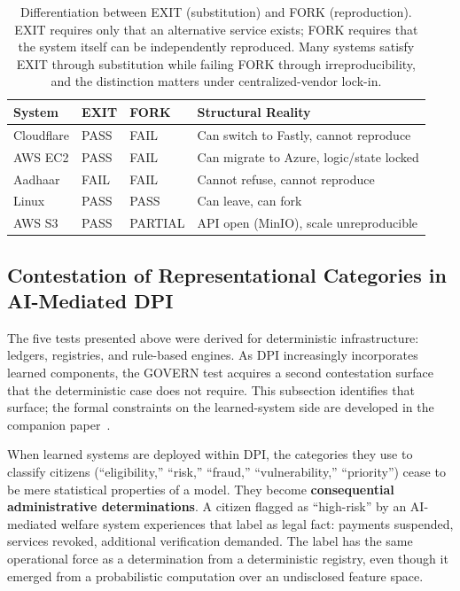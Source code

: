 \documentclass{article}
\begin{document}
\begin{table}[htbp]
\centering
\begin{tabular}{@{}lllp{5.5cm}@{}}
\toprule
\textbf{System} & \textbf{EXIT} & \textbf{FORK} & \textbf{Structural Reality} \\
\midrule
Cloudflare & PASS & FAIL & Can switch to Fastly, cannot reproduce \\
AWS EC2 & PASS & FAIL & Can migrate to Azure, logic/state locked \\
Aadhaar & FAIL & FAIL & Cannot refuse, cannot reproduce \\
Linux & PASS & PASS & Can leave, can fork \\
AWS S3 & PASS & PARTIAL & API open (MinIO), scale unreproducible \\
\bottomrule
\end{tabular}
\caption{Differentiation between EXIT (substitution) and FORK (reproduction). EXIT requires only that an alternative service exists; FORK requires that the system itself can be independently reproduced. Many systems satisfy EXIT through substitution while failing FORK through irreproducibility, and the distinction matters under centralized-vendor lock-in.}
\label{tab:exit-fork-differentiation}
\end{table}

\subsection{Contestation of Representational Categories in AI-Mediated DPI}
\label{subsec:contestation}

The five tests presented above were derived for deterministic infrastructure: ledgers, registries, and rule-based engines. As DPI increasingly incorporates learned components, the GOVERN test acquires a second contestation surface that the deterministic case does not require. This subsection identifies that surface; the formal constraints on the learned-system side are developed in the companion paper~\citep{aravind2026epi}.

When learned systems are deployed within DPI, the categories they use to classify citizens (``eligibility,'' ``risk,'' ``fraud,'' ``vulnerability,'' ``priority'') cease to be mere statistical properties of a model. They become \textbf{consequential administrative determinations}. A citizen flagged as ``high-risk'' by an AI-mediated welfare system experiences that label as legal fact: payments suspended, services revoked, additional verification demanded. The label has the same operational force as a determination from a deterministic registry, even though it emerged from a probabilistic computation over an undisclosed feature space.
\end{document}
